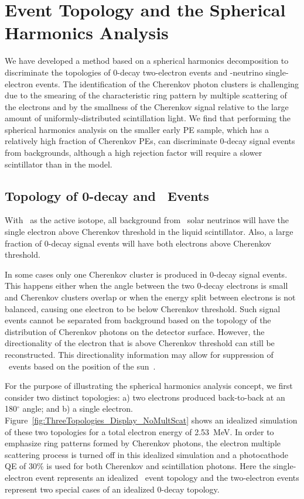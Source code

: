 \section{Event Topology and the Spherical Harmonics Analysis}
\label{sec:topology_and_harmonics}

We have developed a method based on a spherical harmonics
decomposition to discriminate the topologies of 0\nbb-decay
two-electron events and \B-neutrino single-electron events. The
identification of the Cherenkov photon clusters is challenging due to
the smearing of the characteristic ring pattern by multiple scattering
of the electrons and by the smallness of the Cherenkov signal
relative to the large amount of uniformly-distributed scintillation
light.  We find that performing the spherical harmonics analysis on
the smaller early PE sample, which has a relatively high fraction
of Cherenkov PEs, can discriminate 0\nbb-decay signal events from
backgrounds, although a high rejection factor will require a slower
scintillator than in the model.

\subsection{Topology of 0\nbb-decay and \B~Events}
\label{subsec:topology}

With \Te~as the active isotope, all background from \B~solar neutrinos
will have the single electron above Cherenkov threshold in the liquid
scintillator. Also, a large fraction of 0\nbb-decay signal events will
have both electrons above Cherenkov threshold.

In some cases only one Cherenkov cluster is produced in 0\nbb-decay
signal events. This happens either when the angle between the two
0\nbb-decay electrons is small and Cherenkov clusters overlap or when
the energy split between electrons is not balanced, causing one
electron to be below Cherenkov threshold.  Such signal events cannot
be separated from background based on the topology of the distribution
of Cherenkov photons on the detector surface.  However, the
directionality of the electron that is above Cherenkov threshold can
still be reconstructed. This directionality information may allow for
suppression of \B~events based on the position of the
sun~\cite{theia_white_paper}.

For the purpose of illustrating the spherical harmonics analysis
concept, we first consider two distinct topologies: a) two electrons
produced back-to-back at an 180$^{\circ}$ angle;  and b) a single electron.
Figure~\ref{fig:ThreeTopologies_Display_NoMultScat} shows an idealized
simulation of these two topologies for a total electron energy of
2.53~MeV. In order to emphasize ring patterns formed by Cherenkov
photons, the electron multiple scattering process is turned off in this
idealized simulation and a photocathode QE of 30\% is used for both
Cherenkov and scintillation photons. Here the single-electron event
represents an idealized \B~event topology and the two-electron events
represent two special cases of an idealized 0\nbb-decay topology.


